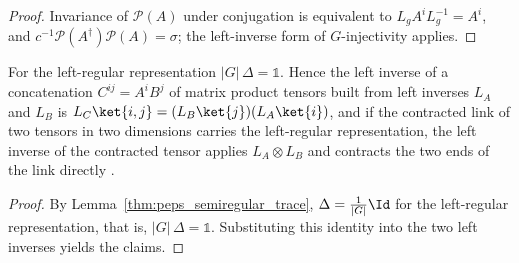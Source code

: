 \begin{proof}\leanok
    Invariance of $\mathcal{P}(A)$ under conjugation is equivalent to
    $L_gA^iL_g^{-1}=A^i$, and
    $c^{-1}\mathcal{P}(A^\dagger)\mathcal{P}(A)=\sigma$; the left-inverse form
    of $G$-injectivity applies.
\end{proof}

\begin{lemma}%
    \label{lem:peps_regular_left_inverse}
    \leanok
    For the left-regular representation $|G|\,\Delta=\mathbb{1}$. Hence the
    left inverse of a concatenation $C^{ij}=A^iB^j$ of matrix product tensors
    built from left inverses $L_A$ and $L_B$ is
    $L_C\ket{i,j}=(L_B\ket{j})(L_A\ket{i})$, and if the contracted link of two
    tensors in two dimensions carries the left-regular representation, the left
    inverse of the contracted tensor applies $L_A\otimes L_B$ and contracts the
    two ends of the link directly \cite[Lemma~6.2]{Schuch2010PEPS}.
\end{lemma}

\begin{proof}\leanok
    By Lemma~\ref{thm:peps_semiregular_trace}, $\Delta=\frac{1}{|G|}\Id$ for
    the left-regular representation, that is, $|G|\,\Delta=\mathbb{1}$.
    Substituting this identity into the two left inverses yields the claims.
\end{proof}

